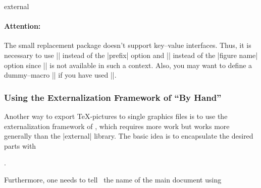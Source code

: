 \begin{pgfplotslibrary}{external}
\paragraph{Attention:} The small replacement package doesn't support key--value interfaces. Thus, it is necessary to use || instead of the |prefix| option and || instead of the |figure name| option since |\tikzset| is not available in such a context. Also, you may want to define a dummy--macro |\pgfplotsset| if you have used |\pgfplotsset|.
\end{pgfplotslibrary}

\subsubsection[Using the Externalization Framework of PGF By Hand]{Using the Externalization Framework of {\normalfont\pgfname} ``By Hand''}
Another way to export \TeX-pictures to single graphics files is to use the externalization framework of \pgfname, which requires more work but works more generally than the |external| library.
The basic idea is to encapsulate the desired parts with

\declareandlabel{\beginpgfgraphicnamed}


\declareandlabel{\endpgfgraphicnamed}. 

\noindent Furthermore, one needs to tell \pgfname\ the name of the main document using

\declareandlabel{\pgfrealjobname}

